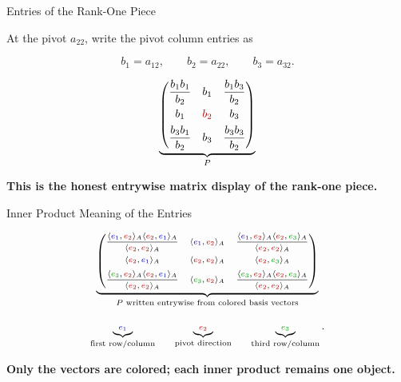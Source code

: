 \documentclass[10pt]{beamer}
\theoremstyle{definition}
\newcommand{\x}[1]{\alert{\textbf{#1}}}
\newcommand{\rd}[1]{{\color{red!70!black}#1}}
\newcommand{\bl}[1]{{\color{blue!70!black}#1}}
\newcommand{\gn}[1]{{\color{green!60!black}#1}}
\begin{document}
\begin{frame}{Entries of the Rank-One Piece}

At the pivot $a_{22}$, write the pivot column entries as

$$
b_1=a_{12},\qquad b_2=a_{22},\qquad b_3=a_{32}.
$$

\vfill

\[
\underbrace{
\begin{pmatrix}
\dfrac{b_1b_1}{b_2}&b_1&\dfrac{b_1b_3}{b_2}\\[0.8em]
b_1&\rd{b_2}&b_3\\[0.4em]
\dfrac{b_3b_1}{b_2}&b_3&\dfrac{b_3b_3}{b_2}
\end{pmatrix}}_{P}
\]

\begin{center}
\x{This is the honest entrywise matrix display of the rank-one piece.}
\end{center}

\end{frame}



\begin{frame}[shrink=8]{Inner Product Meaning of the Entries}

\[
\scriptsize
\underbrace{
\begin{pmatrix}
\dfrac{\langle \bl{e_1},\rd{e_2}\rangle_A\langle \rd{e_2},\bl{e_1}\rangle_A}{\langle \rd{e_2},\rd{e_2}\rangle_A}
&
\langle \bl{e_1},\rd{e_2}\rangle_A
&
\dfrac{\langle \bl{e_1},\rd{e_2}\rangle_A\langle \rd{e_2},\gn{e_3}\rangle_A}{\langle \rd{e_2},\rd{e_2}\rangle_A}
\\[1.0em]
\langle \rd{e_2},\bl{e_1}\rangle_A
&
\langle \rd{e_2},\rd{e_2}\rangle_A
&
\langle \rd{e_2},\gn{e_3}\rangle_A
\\[0.6em]
\dfrac{\langle \gn{e_3},\rd{e_2}\rangle_A\langle \rd{e_2},\bl{e_1}\rangle_A}{\langle \rd{e_2},\rd{e_2}\rangle_A}
&
\langle \gn{e_3},\rd{e_2}\rangle_A
&
\dfrac{\langle \gn{e_3},\rd{e_2}\rangle_A\langle \rd{e_2},\gn{e_3}\rangle_A}{\langle \rd{e_2},\rd{e_2}\rangle_A}
\end{pmatrix}}_{P\text{ written entrywise from colored basis vectors}}
\]

\vfill

\[
\scriptsize
\underbrace{\bl{e_1}}_{\text{first row/column}}
\qquad
\underbrace{\rd{e_2}}_{\text{pivot direction}}
\qquad
\underbrace{\gn{e_3}}_{\text{third row/column}}.
\]

\vfill

\begin{center}
\x{Only the vectors are colored; each inner product remains one object.}
\end{center}

\end{frame}
\end{document}
